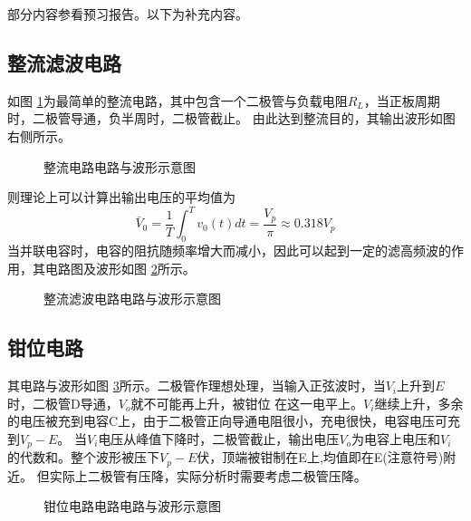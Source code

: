 \documentclass[a4paper,11pt,UTF8]{ctexart}
\begin{document}
部分内容参看预习报告。以下为补充内容。

\subsection{整流滤波电路}
如图 \ref{fig:SVCsim}为最简单的整流电路，其中包含一个二极管与负载电阻$R_L$，当正板周期时，二极管导通，负半周时，二极管截止。
由此达到整流目的，其输出波形如图右侧所示。
\begin{figure}[htbp]
  \centering
  \caption{整流电路电路与波形示意图}
  \label{fig:SVCsim}
  \end{figure}
则理论上可以计算出输出电压的平均值为
\begin{equation}
  \bar{V}_0=\frac{1}{T}\int_0^Tv_0(t)dt=\frac{V_p}{\pi}\approx0.318V_p
\label{eqa:avgV_SVC}
\end{equation}
当并联电容时，电容的阻抗随频率增大而减小，因此可以起到一定的滤高频波的作用，其电路图及波形如图 \ref{fig:SVCcom}所示。
\begin{figure}[htbp]
  \centering
  \caption{整流滤波电路电路与波形示意图}
  \label{fig:SVCcom}
  \end{figure}

\subsection{钳位电路}
其电路与波形如图 \ref{fig:clamper}所示。二极管作理想处理，当输入正弦波时，当$V_i$上升到$E$时，二极管D导通，$V_o$就不可能再上升，被钳位
在这一电平上。$V_i$继续上升，多余的电压被充到电容C上，由于二极管正向导通电阻很小，充电很快，电容电压可充到$V_p-E$。
当$V_i$电压从峰值下降时，二极管截止，输出电压$V_o$为电容上电压和$V_i$的代数和。整个波形被压下$V_p-E$伏，顶端被钳制在E上,均值即在E(注意符号)附近。
但实际上二极管有压降，实际分析时需要考虑二极管压降。
\begin{figure}[htbp]
  \centering
  \caption{钳位电路电路电路与波形示意图}
  \label{fig:clamper}
  \end{figure}
\end{document}
